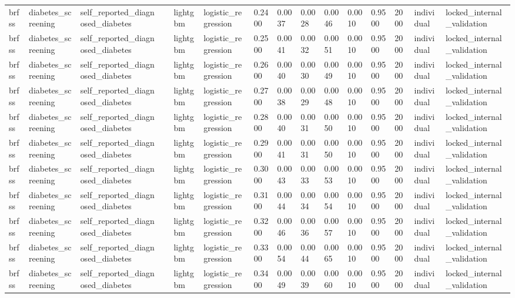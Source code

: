 \begin{tabular}{lllllllllllllll}
brfss & diabetes\_screening & self\_reported\_diagnosed\_diabetes &  & lightgbm & logistic\_regression & 0.2400 & 0.0037 & 0.0028 & 0.0046 & 0.0010 & 0.9500 & 2000 & individual & locked\_internal\_validation \\
brfss & diabetes\_screening & self\_reported\_diagnosed\_diabetes &  & lightgbm & logistic\_regression & 0.2500 & 0.0041 & 0.0032 & 0.0051 & 0.0010 & 0.9500 & 2000 & individual & locked\_internal\_validation \\
brfss & diabetes\_screening & self\_reported\_diagnosed\_diabetes &  & lightgbm & logistic\_regression & 0.2600 & 0.0040 & 0.0030 & 0.0049 & 0.0010 & 0.9500 & 2000 & individual & locked\_internal\_validation \\
brfss & diabetes\_screening & self\_reported\_diagnosed\_diabetes &  & lightgbm & logistic\_regression & 0.2700 & 0.0038 & 0.0029 & 0.0048 & 0.0010 & 0.9500 & 2000 & individual & locked\_internal\_validation \\
brfss & diabetes\_screening & self\_reported\_diagnosed\_diabetes &  & lightgbm & logistic\_regression & 0.2800 & 0.0040 & 0.0031 & 0.0050 & 0.0010 & 0.9500 & 2000 & individual & locked\_internal\_validation \\
brfss & diabetes\_screening & self\_reported\_diagnosed\_diabetes &  & lightgbm & logistic\_regression & 0.2900 & 0.0041 & 0.0031 & 0.0050 & 0.0010 & 0.9500 & 2000 & individual & locked\_internal\_validation \\
brfss & diabetes\_screening & self\_reported\_diagnosed\_diabetes &  & lightgbm & logistic\_regression & 0.3000 & 0.0043 & 0.0033 & 0.0053 & 0.0010 & 0.9500 & 2000 & individual & locked\_internal\_validation \\
brfss & diabetes\_screening & self\_reported\_diagnosed\_diabetes &  & lightgbm & logistic\_regression & 0.3100 & 0.0044 & 0.0034 & 0.0054 & 0.0010 & 0.9500 & 2000 & individual & locked\_internal\_validation \\
brfss & diabetes\_screening & self\_reported\_diagnosed\_diabetes &  & lightgbm & logistic\_regression & 0.3200 & 0.0046 & 0.0036 & 0.0057 & 0.0010 & 0.9500 & 2000 & individual & locked\_internal\_validation \\
brfss & diabetes\_screening & self\_reported\_diagnosed\_diabetes &  & lightgbm & logistic\_regression & 0.3300 & 0.0054 & 0.0044 & 0.0065 & 0.0010 & 0.9500 & 2000 & individual & locked\_internal\_validation \\
brfss & diabetes\_screening & self\_reported\_diagnosed\_diabetes &  & lightgbm & logistic\_regression & 0.3400 & 0.0049 & 0.0039 & 0.0060 & 0.0010 & 0.9500 & 2000 & individual & locked\_internal\_validation \\

\end{tabular}
